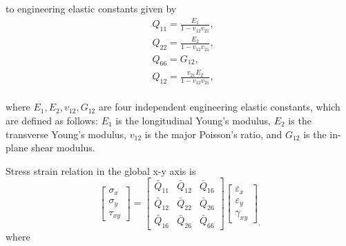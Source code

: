 to engineering elastic constants given by
\begin{equation}
    \begin{split}
	&Q_{11}=\frac{E_1}{1-v_{12}v_{21}},\\
	&Q_{22}=\frac{E_2}{1-v_{12}v_{21}},\\
	&Q_{66}=G_{12},\\
	&Q_{12}=\frac{v_{21}E_2}{1-v_{12}v_{21}},\\
    \end{split}
\end{equation}

where $E_1, E_2, v_{12}, G_{12} $ are four independent engineering elastic constants, which are defined as follows: $E_1 $ is the longitudinal Young's modulus, $E_2 $ is the transverse Young's modulus, $v_{12} $ is the major Poisson's ratio, and $G_{12} $ is the in-plane shear modulus.

Stress strain relation in the global x-y axis is
\begin{equation}\left[\begin{array}{l}\sigma _{x} \\ \sigma _{y} \\
	\tau_{xy}\end{array}\right]=\left[\begin{array}{lll}\bar{Q}_{11} &
\bar{Q}_{12} & \bar{Q}_{16}\\ \bar{Q}_{12} & \bar{Q}_{22} & \bar{Q}_{26} \\
\bar{Q}_{16} & \bar{Q}_{26}
			 &\bar{Q}_{66}\end{array}\right]\left[\begin{array}{l}\varepsilon_{x}
	 \\ \varepsilon_{y}\\ \gamma_{x y}\end{array}\right]_{\textstyle ,}
\end{equation}
where

